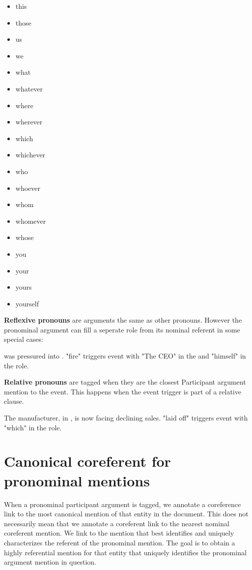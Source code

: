 \begin{multicols}{5}
\begin{itemize}[noitemsep]
    \item this \item those \item us \item we \item what 
    \item whatever \item where \item wherever \item which \item whichever 
    \item who \item whoever \item whom \item whomever \item whose 
    \item you \item your \item yours \item yourself
\end{itemize}
\end{multicols}

\noindent\textbf{Reflexive pronouns} are arguments the same as other pronouns.
However the pronominal argument can fill a seperate role from its nominal referent in some special cases:

\begin{exe}
    \ex {} was pressured into  .
        \expl "fire" triggers  event with "The CEO" in the  and "himself" in the  role.
\end{exe}

\noindent\textbf{Relative pronouns} are tagged when they are the closest Participant argument mention to the event.
This happens when the event trigger is part of a relative clause.

\begin{exe}
    \ex The manufacturer,    in , is now facing declining sales.
        \expl "laid off" triggers  event with "which" in the  role.
\end{exe}


\section{Canonical coreferent for pronominal mentions}
When a pronominal participant argument is tagged, we annotate a coreference link to the most canonical mention of that entity in the document.
This does not necessarily mean that we annotate a coreferent link to the nearest nominal coreferent mention.
We link to the mention that best identifies and uniquely characterizes the referent of the pronominal mention.
The goal is to obtain a highly referential mention for that entity that uniquely identifies the pronominal argument mention in question.

